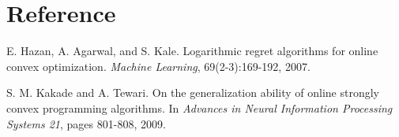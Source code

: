\documentclass[a4paper,UTF8]{article}
\numberwithin{equation}{section}
\begin{document}
\section*{Reference}
\begin{enumerate}[ {[}1{]}]
\item E. Hazan, A. Agarwal, and S. Kale. Logarithmic regret algorithms for online convex optimization. \textit{Machine Learning}, 69(2-3):169-192, 2007.
\item S. M. Kakade and A. Tewari. On the generalization ability of online strongly convex programming algorithms. In \textit{Advances in Neural Information Processing Systems 21}, pages 801-808, 2009.
\end{enumerate}
\end{document}
